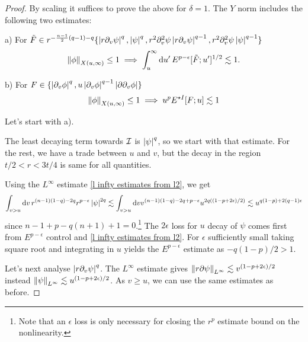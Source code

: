 \documentclass[11pt, oneside]{amsart}
\begin{document}
	\begin{proof}
		By scaling it suffices to prove the above for $\delta=1$. The $Y$ norm includes the following two estimates:
		
		a) For $\tilde{F}\in r^{-\frac{n-1}{2}(q-1)-q}\{\left\lvert r\partial_v\psi\right\rvert^q,\left\lvert \psi\right\rvert^q,r^2\partial_v^2\psi \left\lvert r\partial_v\psi\right\rvert^{q-1},r^2\partial_v^2\psi \left\lvert \psi\right\rvert^{q-1}\}$
		\begin{equation*}
			\begin{gathered}
				\left\lVert \phi\right\rVert_{X(u,\infty)}\leq 1 \implies \int_u^\infty\mathrm{d} u'\, E^{p-\epsilon}[\tilde{F};u']^{1/2}\lesssim1.
			\end{gathered}
		\end{equation*}
		
		b) 	For $F\in \{\left\lvert \partial_v\phi\right\rvert^q,u\left\lvert \partial_v\phi\right\rvert^{q-1}\left\lvert \partial\partial_v\phi\right\rvert\}$
		\begin{equation*}
			\begin{gathered}
				\left\lVert \phi\right\rVert_{X(u,\infty)}\leq 1 \implies  u^pE^{\star I}[F;u]\lesssim1
			\end{gathered}
		\end{equation*}
		
		Let's start with a).
		
		
		The least decaying term towards $\mathcal{I}$ is $\left\lvert \psi\right\rvert^q$, so we start with that estimate. For the rest, we have a trade between $u$ and $v$, but the decay in the region $t/2<r<3t/4$ is same for all quantities.
		
		Using the $L^\infty$ estimate \cref{l infty estimates from l2}, we get
		\begin{equation*}
			\begin{gathered}
				\int_{v>u}\mathrm{d} v\, r^{(n-1)(1-q)-2q} r^{p-\epsilon}\left\lvert \psi\right\rvert^{2q} \lesssim\int_{v>u}\mathrm{d} v v^{(n-1)(1-q)-2q+p-\epsilon}u^{2q((1-p+2\epsilon)/2)}\lesssim u^{q(1-p)+2(q-1)\epsilon}
			\end{gathered}
		\end{equation*}
		since $n-1+p-q(n+1)+1=0$.\footnote{Note that an $\epsilon$ loss is only necessary for closing the $r^p$ estimate bound on the nonlinearity.} The $2\epsilon$ loss for $u$ decay of $\psi$ comes first from $E^{p-\epsilon}$ control and \cref{l infty estimates from l2}. For $\epsilon$ sufficiently small taking square root and integrating in $u$ yields the $E^{p-\epsilon}$ estimate as $-q(1-p)/2>1$. 
		
		Let's next analyse $\left\lvert r\partial_v\psi\right\rvert^q$. The $L^\infty$ estimate gives $\left\lVert r\partial\psi\right\rVert_{L^\infty}\lesssim v^{(1-p+2\epsilon)/2}$ instead $\left\lVert \psi\right\rVert_{L^\infty}\lesssim u^{(1-p+2\epsilon)/2}$. As $v\geq u$, we can use the same estimates as before. 


\end{proof}
\end{document}
